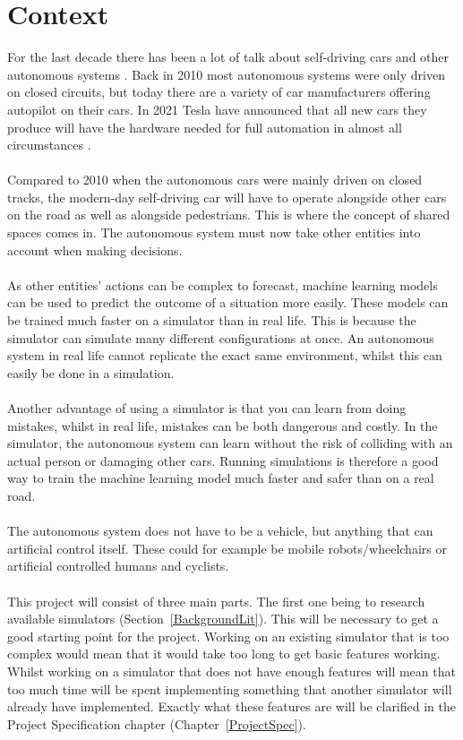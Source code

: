 \newcommand\tab[1][1cm]{\hspace*{#1}}

\section{Context}
For the last decade there has been a lot of talk about self-driving cars and other autonomous systems \cite{markoff_2010}. Back in 2010 most autonomous systems were only driven on closed circuits, but today there are a variety of car manufacturers offering autopilot on their cars. In 2021 Tesla have announced that all new cars they produce will have the hardware needed for full automation in almost all circumstances \cite{teslaSelf}. 
\\~\\ 
Compared to 2010 when the autonomous cars were mainly driven on closed tracks, the modern-day self-driving car will have to operate alongside other cars on the road as well as alongside pedestrians.  This is where the concept of shared spaces comes in. The autonomous system must now take other entities into account when making decisions. 
\\~\\ 
As other entities’ actions can be complex to forecast, machine learning models can be used to predict the outcome of a situation more easily. These models can be trained much faster on a simulator than in real life. This is because the simulator can simulate many different configurations at once. An autonomous system in real life cannot replicate the exact same environment, whilst this can easily be done in a simulation.  
\\~\\ 
Another advantage of using a simulator is that you can learn from doing mistakes, whilst in real life, mistakes can be both dangerous and costly. In the simulator, the autonomous system can learn without the risk of colliding with an actual person or damaging other cars. Running simulations is therefore a good way to train the machine learning model much faster and safer than on a real road.  
\\~\\ 
The autonomous system does not have to be a vehicle, but anything that can artificial control itself. These could for example be mobile robots/wheelchairs or artificial controlled humans and cyclists. 
\\~\\ 
This project will consist of three main parts. The first one being to research available simulators (Section~\ref{BackgroundLit}). This will be necessary to get a good starting point for the project. Working on an existing simulator that is too complex would mean that it would take too long to get basic features working. Whilst working on a simulator that does not have enough features will mean that too much time will be spent implementing something that another simulator will already have implemented. Exactly what these features are will be clarified in the Project Specification chapter (Chapter~\ref{ProjectSpec}). 
